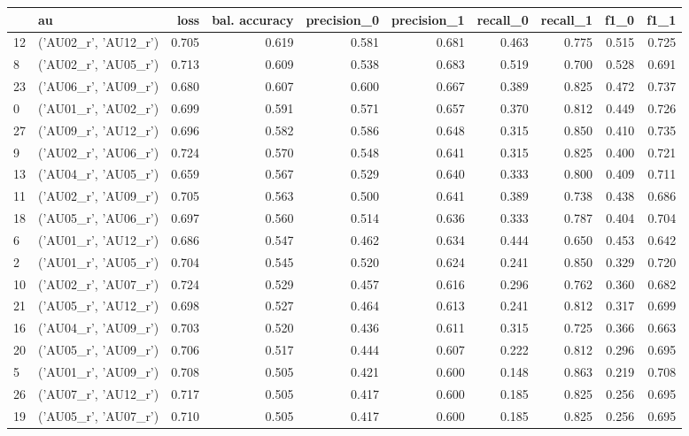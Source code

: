\begin{tabular}{llrrrrrrrr}
\toprule
 & au & loss & bal. accuracy & precision_0 & precision_1 & recall_0 & recall_1 & f1_0 & f1_1 \\
\midrule
12 & ('AU02_r', 'AU12_r') & 0.705 & 0.619 & 0.581 & 0.681 & 0.463 & 0.775 & 0.515 & 0.725 \\
8 & ('AU02_r', 'AU05_r') & 0.713 & 0.609 & 0.538 & 0.683 & 0.519 & 0.700 & 0.528 & 0.691 \\
23 & ('AU06_r', 'AU09_r') & 0.680 & 0.607 & 0.600 & 0.667 & 0.389 & 0.825 & 0.472 & 0.737 \\
0 & ('AU01_r', 'AU02_r') & 0.699 & 0.591 & 0.571 & 0.657 & 0.370 & 0.812 & 0.449 & 0.726 \\
27 & ('AU09_r', 'AU12_r') & 0.696 & 0.582 & 0.586 & 0.648 & 0.315 & 0.850 & 0.410 & 0.735 \\
9 & ('AU02_r', 'AU06_r') & 0.724 & 0.570 & 0.548 & 0.641 & 0.315 & 0.825 & 0.400 & 0.721 \\
13 & ('AU04_r', 'AU05_r') & 0.659 & 0.567 & 0.529 & 0.640 & 0.333 & 0.800 & 0.409 & 0.711 \\
11 & ('AU02_r', 'AU09_r') & 0.705 & 0.563 & 0.500 & 0.641 & 0.389 & 0.738 & 0.438 & 0.686 \\
18 & ('AU05_r', 'AU06_r') & 0.697 & 0.560 & 0.514 & 0.636 & 0.333 & 0.787 & 0.404 & 0.704 \\
6 & ('AU01_r', 'AU12_r') & 0.686 & 0.547 & 0.462 & 0.634 & 0.444 & 0.650 & 0.453 & 0.642 \\
2 & ('AU01_r', 'AU05_r') & 0.704 & 0.545 & 0.520 & 0.624 & 0.241 & 0.850 & 0.329 & 0.720 \\
10 & ('AU02_r', 'AU07_r') & 0.724 & 0.529 & 0.457 & 0.616 & 0.296 & 0.762 & 0.360 & 0.682 \\
21 & ('AU05_r', 'AU12_r') & 0.698 & 0.527 & 0.464 & 0.613 & 0.241 & 0.812 & 0.317 & 0.699 \\
16 & ('AU04_r', 'AU09_r') & 0.703 & 0.520 & 0.436 & 0.611 & 0.315 & 0.725 & 0.366 & 0.663 \\
20 & ('AU05_r', 'AU09_r') & 0.706 & 0.517 & 0.444 & 0.607 & 0.222 & 0.812 & 0.296 & 0.695 \\
5 & ('AU01_r', 'AU09_r') & 0.708 & 0.505 & 0.421 & 0.600 & 0.148 & 0.863 & 0.219 & 0.708 \\
26 & ('AU07_r', 'AU12_r') & 0.717 & 0.505 & 0.417 & 0.600 & 0.185 & 0.825 & 0.256 & 0.695 \\
19 & ('AU05_r', 'AU07_r') & 0.710 & 0.505 & 0.417 & 0.600 & 0.185 & 0.825 & 0.256 & 0.695 \\

\end{tabular}
